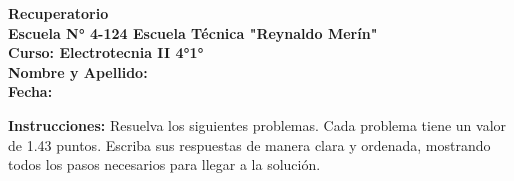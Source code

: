 \documentclass[a4paper,12pt]{article}
\begin{document}
\pagestyle{empty}
\begin{center}
    \textbf{\huge Recuperatorio} \\[0.5cm]
    \textbf{\large Escuela N° 4-124 Escuela Técnica "Reynaldo Merín"} \\[0.5cm]
    \textbf{Curso: Electrotecnia II 4°1°} \\[0.5cm]
    \textbf{Nombre y Apellido: \underline{\hspace{10cm}}} \\[0.5cm]
    \textbf{Fecha: \underline{\hspace{3cm}}} \\[1cm]
\end{center}

\noindent \textbf{Instrucciones:} Resuelva los siguientes problemas. Cada problema tiene un valor de 1.43 puntos. Escriba sus respuestas de manera clara y ordenada, mostrando todos los pasos necesarios para llegar a la solución.

\vspace{0.5cm}
\end{document}
